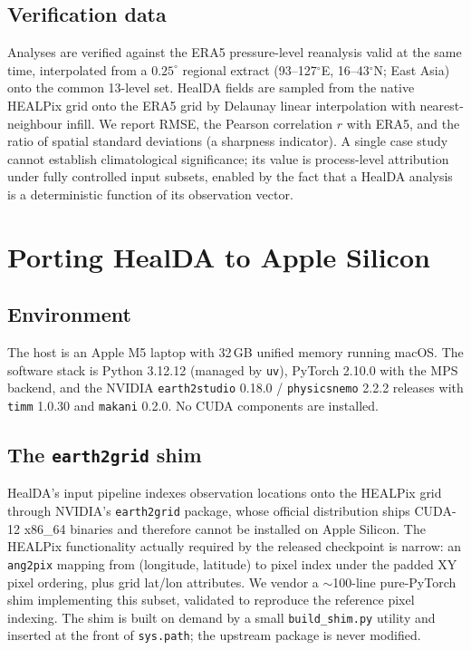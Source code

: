 \documentclass[twocolumn,11pt]{article}
\begin{document}
\subsection{Verification data}
Analyses are verified against the ERA5 pressure-level reanalysis
\citep{hersbach2020era5} valid at the same time, interpolated from a
$0.25^{\circ}$ regional extract (93--127$^{\circ}$E,
16--43$^{\circ}$N; East Asia) onto the common 13-level set. HealDA
fields are sampled from the native HEALPix grid onto the ERA5 grid by
Delaunay linear interpolation with nearest-neighbour infill. We report
RMSE, the Pearson correlation $r$ with ERA5, and the ratio of
spatial standard deviations (a sharpness indicator). A single case
study cannot establish climatological significance; its value is
process-level attribution under fully controlled input subsets,
enabled by the fact that a HealDA analysis is a deterministic
function of its observation vector.

\section{Porting HealDA to Apple Silicon}\label{sec:port}

\subsection{Environment}
The host is an Apple M5 laptop with 32\,GB unified memory running
macOS. The software stack is Python 3.12.12 (managed by
\texttt{uv}), PyTorch 2.10.0 with the MPS backend, and the NVIDIA
\texttt{earth2studio} 0.18.0 / \texttt{physicsnemo} 2.2.2 releases
with \texttt{timm} 1.0.30 and \texttt{makani} 0.2.0. No CUDA
components are installed.

\subsection{The \texttt{earth2grid} shim}
HealDA's input pipeline indexes observation locations onto the HEALPix
grid through NVIDIA's \texttt{earth2grid} package, whose official
distribution ships CUDA-12 x86\_64 binaries and therefore cannot be
installed on Apple Silicon. The HEALPix functionality actually
required by the released checkpoint is narrow: an \texttt{ang2pix}
mapping from (longitude, latitude) to pixel index under the padded
XY pixel ordering, plus grid lat/lon attributes. We vendor a
$\sim$100-line pure-PyTorch shim implementing this subset, validated
to reproduce the reference pixel indexing. The shim is built
on demand by a small \texttt{build\_shim.py} utility and inserted at
the front of \texttt{sys.path}; the upstream package is never
modified.
\end{document}
